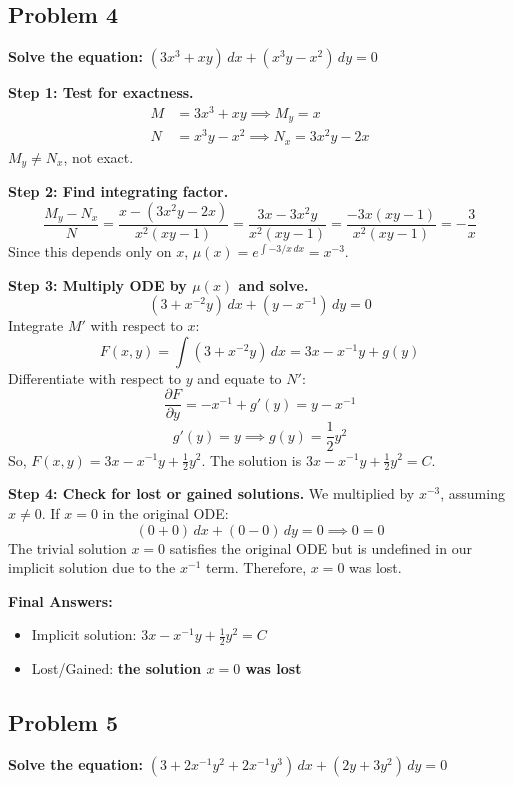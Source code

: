 \documentclass[11pt]{article}
\begin{document}
\hrulefill

\subsection*{Problem 4}
\textbf{Solve the equation:} $(3x^3 + xy) \, dx + (x^3y - x^2) \, dy = 0$

\textbf{Step 1: Test for exactness.}
\begin{align*}
    M &= 3x^3 + xy \implies M_y = x \\
    N &= x^3y - x^2 \implies N_x = 3x^2y - 2x
\end{align*}
$M_y \neq N_x$, not exact.

\textbf{Step 2: Find integrating factor.}
\[ \frac{M_y - N_x}{N} = \frac{x - (3x^2y - 2x)}{x^2(xy - 1)} = \frac{3x - 3x^2y}{x^2(xy - 1)} = \frac{-3x(xy - 1)}{x^2(xy - 1)} = -\frac{3}{x} \]
Since this depends only on $x$, $\mu(x) = e^{\int -3/x \, dx} = x^{-3}$.

\textbf{Step 3: Multiply ODE by $\mu(x)$ and solve.}
\[ (3 + x^{-2}y) \, dx + (y - x^{-1}) \, dy = 0 \]
Integrate $M'$ with respect to $x$:
\[ F(x, y) = \int (3 + x^{-2}y) \, dx = 3x - x^{-1}y + g(y) \]
Differentiate with respect to $y$ and equate to $N'$:
\[ \frac{\partial F}{\partial y} = -x^{-1} + g'(y) = y - x^{-1} \]
\[ g'(y) = y \implies g(y) = \frac{1}{2}y^2 \]
So, $F(x, y) = 3x - x^{-1}y + \frac{1}{2}y^2$. The solution is $3x - x^{-1}y + \frac{1}{2}y^2 = C$.

\textbf{Step 4: Check for lost or gained solutions.} We multiplied by $x^{-3}$, assuming $x \neq 0$. If $x = 0$ in the original ODE:
\[ (0 + 0) \, dx + (0 - 0) \, dy = 0 \implies 0 = 0 \]
The trivial solution $x = 0$ satisfies the original ODE but is undefined in our implicit solution due to the $x^{-1}$ term. Therefore, $x = 0$ was lost.

\textbf{Final Answers:}
\begin{itemize}
    \item Implicit solution: $3x - x^{-1}y + \frac{1}{2}y^2 = C$
    \item Lost/Gained: \textbf{the solution $x = 0$ was lost}
\end{itemize}

\hrulefill

\subsection*{Problem 5}
\textbf{Solve the equation:} $(3 + 2x^{-1}y^2 + 2x^{-1}y^3) \, dx + (2y + 3y^2) \, dy = 0$
\end{document}
